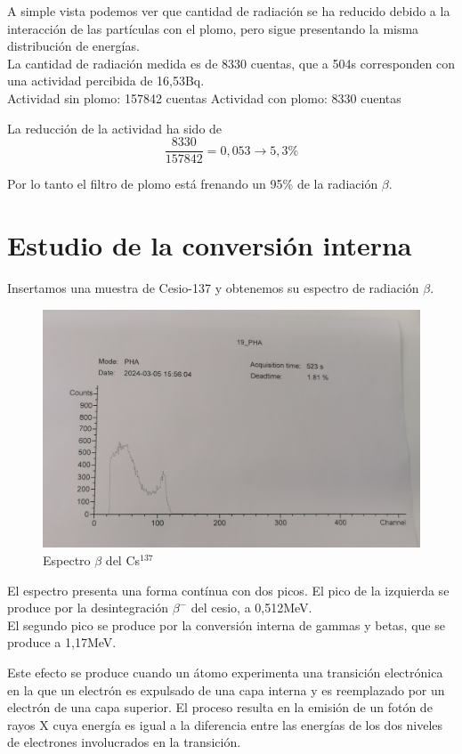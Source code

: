 \documentclass[a4paper,12pt,spanish]{article}
\begin{document}
	A simple vista podemos ver que cantidad de radiación se ha reducido debido a la interacción de las partículas con el plomo, pero sigue presentando la misma distribución de energías.\\
	
	La cantidad de radiación medida es de 8330 cuentas, que a 504s corresponden con una actividad percibida de 16,53Bq.\\
	
	Actividad sin plomo: 157842 cuentas
	Actividad con plomo: 8330 cuentas
	
	La reducción de la actividad ha sido de 
	\[ \frac{8330}{157842} = 0,053 \longrightarrow 5,3\%
	\]
	
	Por lo tanto el filtro de plomo está frenando un 95\% de la radiación $\beta$.   
	
	\section{Estudio de la conversión interna}
	
	Insertamos una muestra de Cesio-137 y obtenemos su espectro de radiación $\beta$.
	
	
	\begin{figure}[H]
		\centering
		\includegraphics[width=0.7\linewidth]{"graficas recortadas/19"}
		\caption{Espectro $\beta$ del Cs$^{137}$}
		\label{fig:19}
	\end{figure}
	
	El espectro presenta una forma contínua con dos picos. El pico de la izquierda se produce por la desintegración $\beta^{-}$ del cesio, a 0,512MeV. \\
	
	El segundo pico se produce por la conversión interna de gammas y betas, que se produce a 1,17MeV.
	
	Este efecto se produce cuando un átomo experimenta una transición electrónica en la que un electrón es expulsado de una capa interna y es reemplazado por un electrón de una capa superior. El proceso resulta en la emisión de un fotón de rayos X cuya energía es igual a la diferencia entre las energías de los dos niveles de electrones involucrados en la transición.
	
	
	
	
	
	
\end{document}
